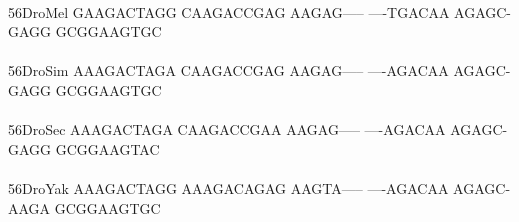 \documentclass[11pt,twoside,reqno,a4paper]{article}
\begin{document}
{\\
56\hspace*{3\charwidth}DroMel	GAAGACTAGG	CAAGACCGAG	AAGAG-----	----TGACAA	AGAGC-GAGG	GCGGAAGTGC	\\
\hspace*{5\charwidth}\hspace*{7\charwidth}\hspace*{1\charwidth}\hspace*{1\charwidth}\hspace*{1\charwidth}\hspace*{1\charwidth}\hspace*{1\charwidth}\hspace*{1\charwidth}\\
56\hspace*{3\charwidth}DroSim	AAAGACTAGA	CAAGACCGAG	AAGAG-----	----AGACAA	AGAGC-GAGG	GCGGAAGTGC	\\
\hspace*{5\charwidth}\hspace*{7\charwidth}\hspace*{1\charwidth}\hspace*{1\charwidth}\hspace*{1\charwidth}\hspace*{1\charwidth}\hspace*{1\charwidth}\hspace*{1\charwidth}\\
56\hspace*{3\charwidth}DroSec	AAAGACTAGA	CAAGACCGAA	AAGAG-----	----AGACAA	AGAGC-GAGG	GCGGAAGTAC	\\
\hspace*{5\charwidth}\hspace*{7\charwidth}\hspace*{1\charwidth}\hspace*{1\charwidth}\hspace*{1\charwidth}\hspace*{1\charwidth}\hspace*{1\charwidth}\hspace*{1\charwidth}\\
56\hspace*{3\charwidth}DroYak	AAAGACTAGG	AAAGACAGAG	AAGTA-----	----AGACAA	AGAGC-AAGA	GCGGAAGTGC	\\
\hspace*{5\charwidth}\hspace*{7\charwidth}\hspace*{1\charwidth}\hspace*{1\charwidth}\hspace*{1\charwidth}\hspace*{1\charwidth}\hspace*{1\charwidth}\hspace*{1\charwidth}\\
}
\end{document}
